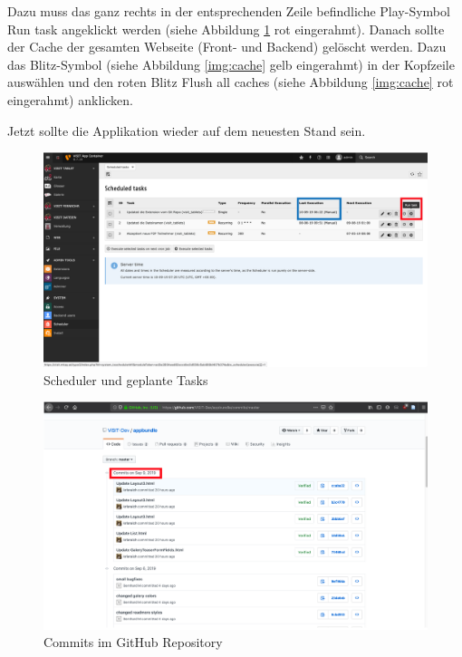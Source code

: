 Dazu muss das ganz rechts in der entsprechenden Zeile befindliche Play-Symbol \glqq Run task\grqq{} angeklickt werden (siehe Abbildung \ref{img:scheduler} rot eingerahmt). Danach sollte der Cache der gesamten Webseite (Front- und Backend) gelöscht werden. Dazu das Blitz-Symbol (siehe Abbildung \ref{img:cache} gelb eingerahmt) in der Kopfzeile auswählen und den roten Blitz \glqq Flush all caches \grqq{} (siehe Abbildung \ref{img:cache} rot eingerahmt) anklicken.

Jetzt sollte die Applikation wieder auf dem neuesten Stand sein.

\begin{figure}[ht!]
\centering
\includegraphics[width=12cm]{Figures/paula/update_prozess/run_task.png}
\caption{Scheduler und geplante Tasks}
\label{img:scheduler}
\end{figure}

\begin{figure}[ht!]
\centering
\includegraphics[width=12cm]{Figures/paula/update_prozess/commits.png}
\caption{Commits im GitHub Repository}
\label{img:commits}
\end{figure}

